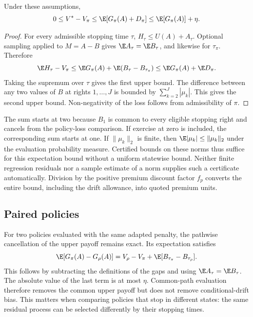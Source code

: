 \begin{proposition}
Under these assumptions,
\begin{equation}
 0\leq V^*-V_\pi
 \leq\E[G_\pi(A)+D_\pi]
 \leq\E[G_\pi(A)]+\eta.
 \label{eq:drift-bound}
\end{equation}
\end{proposition}
\begin{proof}
For every admissible stopping time $\tau$, $H_\tau\leq U(A)+A_\tau$. Optional sampling applied to $M=A-B$ gives $\E A_\tau=\E B_\tau$, and likewise for $\tau_\pi$. Therefore
\[
 \E H_\tau-V_\pi
 \leq \E G_\pi(A)+\E(B_\tau-B_{\tau_\pi})
 \leq \E G_\pi(A)+\E D_\pi.
\]
Taking the supremum over $\tau$ gives the first upper bound. The difference between any two values of $B$ at rights $1,\ldots,J$ is bounded by $\sum_{k=2}^J|\mu_k|$. This gives the second upper bound. Non-negativity of the loss follows from admissibility of $\pi$.
\end{proof}

The sum starts at two because $B_1$ is common to every eligible stopping right and cancels from the policy-loss comparison. If exercise at zero is included, the corresponding sum starts at one. If $\|\mu_k\|_2$ is finite, then $\E|\mu_k|\leq\|\mu_k\|_2$ under the evaluation probability measure. Certified bounds on these norms thus suffice for this expectation bound without a uniform statewise bound. Neither finite regression residuals nor a sample estimate of a norm supplies such a certificate automatically. Division by the positive premium discount factor $f_p$ converts the entire bound, including the drift allowance, into quoted premium units.

\subsection{Paired policies}

For two policies evaluated with the same adapted penalty, the pathwise cancellation of the upper payoff remains exact. Its expectation satisfies
\begin{equation}
 \E[G_\pi(A)-G_\rho(A)]
 =V_\rho-V_\pi+\E[B_{\tau_\pi}-B_{\tau_\rho}].
 \label{eq:paired-drift}
\end{equation}
This follows by subtracting the definitions of the gaps and using $\E A_\tau=\E B_\tau$. The absolute value of the last term is at most $\eta$. Common-path evaluation therefore removes the common upper payoff but does not remove conditional-drift bias. This matters when comparing policies that stop in different states: the same residual process can be selected differently by their stopping times.


